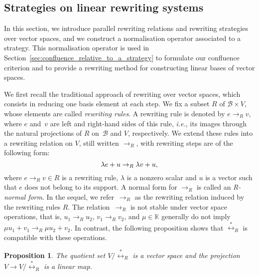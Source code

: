 \documentclass[11pt]{article}
\newtheorem{proposition}[theorem]{Proposition}
\theoremstyle{definition}
\newcommand\ie{\emph{i.e.}}
\newcommand\basis{\mathscr{B}}
\newcommand\K{\mathbb{K}}
\newcommand\rewR{\to_R}
\newcommand\equivR{\overset{*}{\leftrightarrow}_R}
\begin{document}
\subsection{Strategies on linear rewriting systems}
\label{sec:strategies_on_linear_rewriting_systems}

In this section, we introduce parallel rewriting relations and rewriting
strategies over vector spaces, and we construct a normalisation operator
associated to a strategy. This normalisation operator is used in
Section~\ref{sec:confluence_relative_to_a_strategy} to formulate our
confluence criterion and to provide a rewriting method for constructing
linear bases of vector spaces. 
\medskip

We first recall the traditional approach of rewriting over vector spaces,
which consists in reducing one basis element at each step. We fix a
subset $R$ of $\basis\times V$, whose elements are called
{\em rewriting rules}. A rewriting rule is denoted by $e\rewR v$, where
$e$ and~$v$ are left and right-hand sides of this rule, \ie, its images
through the natural projections of $R$  on~$\basis$ and $V$,
respectively. We extend these rules into a rewriting relation on $V$,
still written $\rewR$, with rewriting steps are of the following form: 
\begin{equation}\label{equ:R_rewriting_step}
  \lambda e+u\rewR\lambda v+u,
  \smallskip
\end{equation}
where $e\rewR v\in R$ is a rewriting rule, $\lambda$ is a nonzero scalar
and $u$ is a vector such that $e$ does not belong to its support. A
normal form for $\rewR$ is called an {\em R-normal form}. In the sequel, 
we refer~$\rewR$ as the rewriting relation induced by the rewriting rules
$R$. The relation~$\rewR$ is not stable under vector space
operations, that is, $u_1\rewR u_2$, $v_1\rewR v_2$, and $\mu\in\K$
generally do not imply $\mu u_1+v_1\rewR \mu u_2+v_2$. In contrast, the
following proposition shows that $\equivR$ is compatible with these
operations.
\smallskip

\begin{proposition}\label{prop:vs_structure}
  The quotient set $V/\equivR$ is a vector space and the projection
  $V\to V/\equivR$ is a linear map.
\end{proposition}
\end{document}
